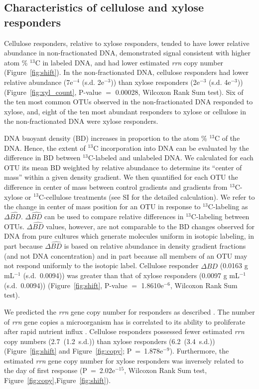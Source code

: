 \subsection{Characteristics of cellulose and xylose responders}
Cellulose responders, relative to xylose responders, tended to have lower
relative abundance in non-fractionated DNA, demonstrated signal consistent with
higher atom \% $^{13}$C in labeled DNA, and had lower estimated \textit{rrn}
copy number (Figure~\ref{fig:shift}). In the non-fractionated DNA, cellulose
responders had lower relative abundance (7e$^{-4}$ (s.d. 2e$^{-3}$)) than
xylose responders (2e$^{-3}$ (s.d. 4e$^{-3}$)) (Figure~\ref{fig:xyl_count},
P-value $=$ 0.00028, Wilcoxon Rank Sum test). Six of the ten most common OTUs
observed in the non-fractionated DNA responded to xylose, and, eight of the ten
most abundant responders to xylose or cellulose in the non-fractionated DNA
were xylose responders.

DNA buoyant density (BD) increases in proportion to the atom \% $^{13}$C of the
DNA. Hence, the extent of $^{13}$C incorporation into DNA can be evaluated 
by the difference in BD between $^{13}$C-labeled and unlabeled DNA. We
calculated for each OTU its mean BD weighted by relative abundance to determine
its ``center of mass'' within a given density gradient. We then quantified for
each OTU the difference in center of mass between control gradients and
gradients from $^{13}$C-xylose or $^{13}$C-cellulose treatments (see SI for the
detailed calculation). We refer to the change in center of mass position for an
OTU in response to $^{13}$C-labeling as $\Delta\hat{BD}$. $\Delta\hat{BD}$ can
be used to compare relative differences in $^{13}$C-labeling between OTUs.
$\Delta\hat{BD}$ values, however, are not comparable to the BD changes observed
for DNA from pure cultures which generate molecules uniform in isotopic
labeling, in part because $\Delta\hat{BD}$ is based on relative abundance in
density gradient fractions (and not DNA concentration) and in part because all
members of an OTU may not respond uniformly to the isotopic label. Cellulose
responder $\Delta\hat{BD}$ (0.0163 g mL$^{-1}$ (s.d.~0.0094)) was greater than
that of xylose responders (0.0097 g mL$^{-1}$ (s.d.~0.0094))
(Figure~\ref{fig:shift}, P-value $=$
1.8610e$^{-6}$, Wilcoxon Rank Sum test). 

We predicted the \textit{rrn} gene copy number for responders as described
\citep{Kembel_2012}. The number of \textit{rrn} gene copies a microorganism has
is correlated to its ability to proliferate after rapid 
nutrient influx \citep{Klappenbach_2000}. Cellulose responders possessed fewer
estimated \textit{rrn} copy numbers (2.7~(1.2~s.d.)) than xylose responders
(6.2~(3.4~s.d.)) (Figure~\ref{fig:shift} and Figure~\ref{fig:copy};
P~=~1.878e$^{-9}$). Furthermore, the estimated \textit{rrn} gene copy number
for xylose responders was inversely related to the day of first response
(P~=~2.02e$^{-15}$, Wilcoxon Rank Sum test,
Figure~\ref{fig:copy},Figure~\ref{fig:shift}).

